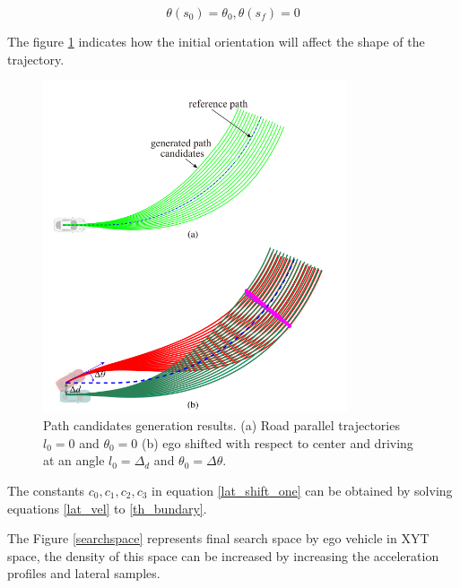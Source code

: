 \begin{equation}
\theta(s_0) = \theta_0 , \theta(s_f) = 0
\label{th_bundary}
\end{equation}

The figure \ref{lat_planning} indicates how the initial orientation will affect the shape of the trajectory. 

 \begin{figure}
    \centering
    \includegraphics[width=0.8\textwidth]{Images/lateral_planning.png}
    \caption{Path candidates generation results. (a) Road parallel trajectories $l_0 = 0$ and $\theta_0 = 0$ (b) ego shifted with respect to center and driving at an angle $ 
l_0 = \Delta_d$ and $ \theta_0 = \Delta\theta$. \cite{real_time_traj_plan_article}}
    \label{lat_planning}
\end{figure}


The constants $ { c_0,c_1,c_2,c_3}  $ in equation \ref{lat_shift_one} can be obtained by solving equations \ref{lat_vel} to \ref{th_bundary}.

The Figure \ref{searchspace} represents final search space by ego vehicle in XYT space, the density of this space can be increased by increasing the acceleration profiles and lateral samples. 


